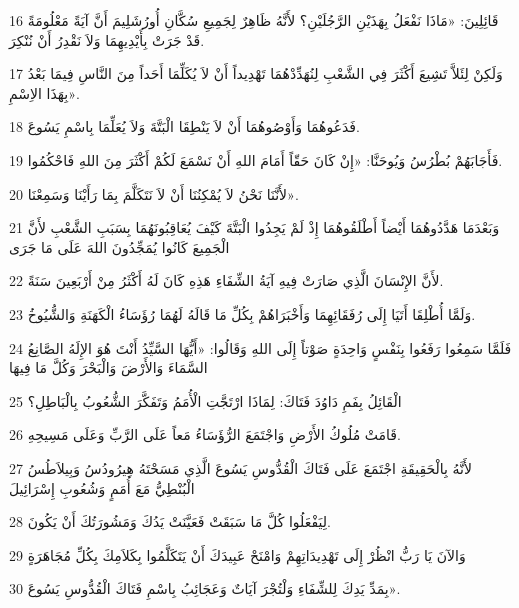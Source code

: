 \par 16 قَائِلِينَ: «مَاذَا نَفْعَلُ بِهَذَيْنِ الرَّجُلَيْنِ؟ لأَنَّهُ ظَاهِرٌ لِجَمِيعِ سُكَّانِ أُورُشَلِيمَ أَنَّ آيَةً مَعْلُومَةً قَدْ جَرَتْ بِأَيْدِيهِمَا وَلاَ نَقْدِرُ أَنْ نُنْكِرَ.
\par 17 وَلَكِنْ لِئَلاَّ تَشِيعَ أَكْثَرَ فِي الشَّعْبِ لِنُهَدِّدْهُمَا تَهْدِيداً أَنْ لاَ يُكَلِّمَا أَحَداً مِنَ النَّاسِ فِيمَا بَعْدُ بِهَذَا الاِسْمِ».
\par 18 فَدَعُوهُمَا وَأَوْصُوهُمَا أَنْ لاَ يَنْطِقَا الْبَتَّةَ وَلاَ يُعَلِّمَا بِاسْمِ يَسُوعَ.
\par 19 فَأَجَابَهُمْ بُطْرُسُ وَيُوحَنَّا: «إِنْ كَانَ حَقّاً أَمَامَ اللهِ أَنْ نَسْمَعَ لَكُمْ أَكْثَرَ مِنَ اللهِ فَاحْكُمُوا.
\par 20 لأَنَّنَا نَحْنُ لاَ يُمْكِنُنَا أَنْ لاَ نَتَكَلَّمَ بِمَا رَأَيْنَا وَسَمِعْنَا».
\par 21 وَبَعْدَمَا هَدَّدُوهُمَا أَيْضاً أَطْلَقُوهُمَا إِذْ لَمْ يَجِدُوا الْبَتَّةَ كَيْفَ يُعَاقِبُونَهُمَا بِسَبَبِ الشَّعْبِ لأَنَّ الْجَمِيعَ كَانُوا يُمَجِّدُونَ اللهَ عَلَى مَا جَرَى
\par 22 لأَنَّ الإِنْسَانَ الَّذِي صَارَتْ فِيهِ آيَةُ الشِّفَاءِ هَذِهِ كَانَ لَهُ أَكْثَرُ مِنْ أَرْبَعِينَ سَنَةً.
\par 23 وَلَمَّا أُطْلِقَا أَتَيَا إِلَى رُفَقَائِهِمَا وَأَخْبَرَاهُمْ بِكُلِّ مَا قَالَهُ لَهُمَا رُؤَسَاءُ الْكَهَنَةِ وَالشُّيُوخُ.
\par 24 فَلَمَّا سَمِعُوا رَفَعُوا بِنَفْسٍ وَاحِدَةٍ صَوْتاً إِلَى اللهِ وَقَالُوا: «أَيُّهَا السَّيِّدُ أَنْتَ هُوَ الإِلَهُ الصَّانِعُ السَّمَاءَ وَالأَرْضَ وَالْبَحْرَ وَكُلَّ مَا فِيهَا
\par 25 الْقَائِلُ بِفَمِ دَاوُدَ فَتَاكَ: لِمَاذَا ارْتَجَّتِ الْأُمَمُ وَتَفَكَّرَ الشُّعُوبُ بِالْبَاطِلِ؟
\par 26 قَامَتْ مُلُوكُ الأَرْضِ وَاجْتَمَعَ الرُّؤَسَاءُ مَعاً عَلَى الرَّبِّ وَعَلَى مَسِيحِهِ.
\par 27 لأَنَّهُ بِالْحَقِيقَةِ اجْتَمَعَ عَلَى فَتَاكَ الْقُدُّوسِ يَسُوعَ الَّذِي مَسَحْتَهُ هِيرُودُسُ وَبِيلاَطُسُ الْبُنْطِيُّ مَعَ أُمَمٍ وَشُعُوبِ إِسْرَائِيلَ
\par 28 لِيَفْعَلُوا كُلَّ مَا سَبَقَتْ فَعَيَّنَتْ يَدُكَ وَمَشُورَتُكَ أَنْ يَكُونَ.
\par 29 وَالآنَ يَا رَبُّ انْظُرْ إِلَى تَهْدِيدَاتِهِمْ وَامْنَحْ عَبِيدَكَ أَنْ يَتَكَلَّمُوا بِكَلاَمِكَ بِكُلِّ مُجَاهَرَةٍ
\par 30 بِمَدِّ يَدِكَ لِلشِّفَاءِ وَلْتُجْرَ آيَاتٌ وَعَجَائِبُ بِاسْمِ فَتَاكَ الْقُدُّوسِ يَسُوعَ».
